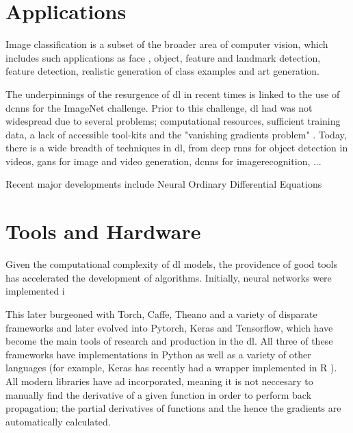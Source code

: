 

\section{Applications}

Image classification is a subset of the broader area of computer vision, which includes such applications as face , object, feature and landmark detection, feature detection, realistic  generation of class examples and art generation.  
\bigskip

The underpinnings of the resurgence of \gls{dl} in recent times is linked to the use of \gls{dcnn}s for the ImageNet challenge. Prior to this challenge, \gls{dl} had was not widespread due to several problems; computational resources, sufficient training data, a lack of accessible tool-kits and the "vanishing gradients problem" \cite[Chapter~8]{good_fellow_2016}. Today, there is a wide breadth of techniques in \gls{dl}, from deep \gls{rnn}s for object detection in videos, \gls{gan}s for image and video generation, \gls{dcnn}s for \gls{imagerecognition}, ... 

Recent major developments include Neural Ordinary Differential Equations

\section{Tools and Hardware}

Given the computational complexity of  \gls{dl} models, the providence of good tools has accelerated the development of algorithms.  Initially, neural networks were implemented i

This later burgeoned with Torch, Caffe, Theano and a variety of disparate frameworks and later evolved into Pytorch, Keras and Tensorflow, which have become the main tools of research and production in the \gls{dl}. All three of these frameworks have implementations in Python as well as a variety of other languages (for example, Keras has recently had a wrapper implemented in R \cite{keras_r}). All modern libraries have \gls{ad} incorporated, meaning it is not neccesary to manually find the derivative of a given function in order to perform back propagation; the partial derivatives of functions and the hence the gradients are automatically calculated.  \bigskip

